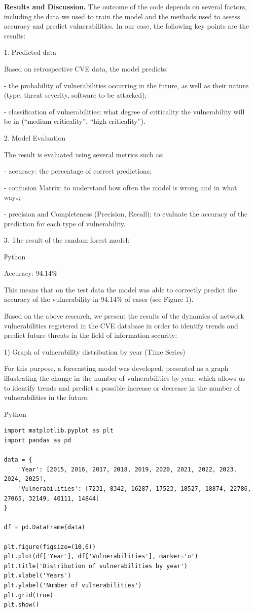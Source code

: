\begin{multicols}{2}
{\bfseries Results and Discussion.} The outcome of the code depends on
several factors, including the data we used to train the model and the
methods used to assess accuracy and predict vulnerabilities. In our
case, the following key points are the results:

1. Predicted data

Based on retrospective CVE data, the model predicts:

- the probability of vulnerabilities occurring in the future, as well as
their nature (type, threat severity, software to be attacked);

- classification of vulnerabilities: what degree of criticality the
vulnerability will be in (``medium criticality'', ``high criticality'').

2. Model Evaluation

The result is evaluated using several metrics such as:

- accuracy: the percentage of correct predictions;

- confusion Matrix: to understand how often the model is wrong and in
what ways;

- precision and Completeness (Precision, Recall): to evaluate the
accuracy of the prediction for each type of vulnerability.

3. The result of the random forest model:

Рython

Accuracy: 94.14\%

This means that on the test data the model was able to correctly predict
the accuracy of the vulnerability in 94.14\% of cases (see Figure 1).

Based on the above research, we present the results of the dynamics of
network vulnerabilities registered in the CVE database in order to
identify trends and predict future threats in the field of information
security:

1) Graph of vulnerability distribution by year (Time Series)

For this purpose, a forecasting model was developed, presented as a
graph illustrating the change in the number of vulnerabilities by year,
which allows us to identify trends and predict a possible increase or
decrease in the number of vulnerabilities in the future.
\end{multicols}

Python

\begin{lstlisting}
import matplotlib.pyplot as plt
import pandas as pd

data = {
    'Year': [2015, 2016, 2017, 2018, 2019, 2020, 2021, 2022, 2023, 2024, 2025],
    'Vulnerabilities': [7231, 8342, 16287, 17523, 18527, 18874, 22786, 27065, 32149, 40111, 14844]
}

df = pd.DataFrame(data)

plt.figure(figsize=(10,6))
plt.plot(df['Year'], df['Vulnerabilities'], marker='o')
plt.title('Distribution of vulnerabilities by year')
plt.xlabel('Years')
plt.ylabel('Number of vulnerabilities')
plt.grid(True)
plt.show()
\end{lstlisting}

